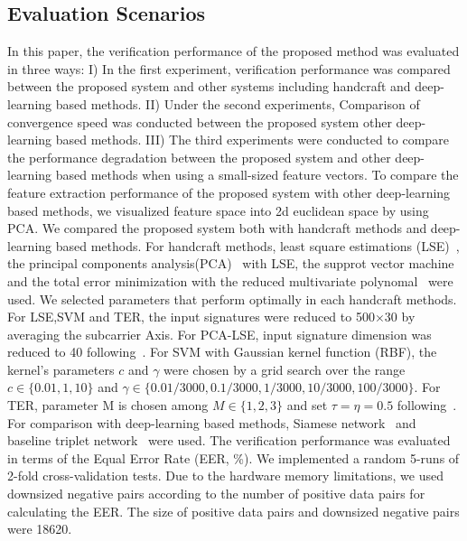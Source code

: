 \subsection{Evaluation Scenarios}
In this paper, the verification performance of the proposed method was evaluated in three ways:
I) In the first experiment, verification performance was compared between the proposed system and other systems including handcraft and deep-learning based methods.
II) Under the second experiments, Comparison of convergence speed was conducted between the proposed system other deep-learning based methods. 
III) The third experiments were conducted to compare the performance degradation between the proposed system and other deep-learning based methods when using a small-sized feature vectors. 
To compare the feature extraction performance of the proposed system with other deep-learning based methods, we visualized feature space into 2d euclidean space by using PCA. 
We compared the proposed system both with handcraft methods and deep-learning based methods.
For handcraft methods, least square estimations (LSE)~\cite{duda2012pattern}, the principal components analysis(PCA)~\cite{turk1991eigenfaces} with LSE, the supprot vector machine~\cite{vapnik2013nature} and the total error minimization with the reduced multivariate polynomal~\cite{toh2003fingerprint,toh2008between} were used. We selected parameters that perform optimally in each handcraft methods. For LSE,SVM and TER, the input signatures were reduced to 500$\times$30 by averaging the subcarrier Axis. For PCA-LSE, input signature dimension was reduced to 40 following~\cite{moon2017air}. For SVM with Gaussian kernel function (RBF), the kernel's parameters $c$ and $\gamma$ were chosen by a grid search over the range $c\in\{0.01,1,10\}$ and $\gamma\in\{0.01/3000, 0.1/3000, 1/3000, 10/3000, 100/3000\}$. For TER, parameter M is chosen among $M\in\{1,2,3\}$ and set $\tau=\eta=0.5$ following~\cite{toh2008between}.
For comparison with deep-learning based methods, Siamese network~\cite{koch2015siamese} and baseline triplet network~\cite{hoffer2015deep} were used.
The verification performance was evaluated in terms of the Equal Error Rate (EER, \%). We implemented a random 5-runs of 2-fold cross-validation tests.
Due to the hardware memory limitations, we used downsized negative pairs according to the number of positive data pairs for calculating the EER. The size of positive data pairs and downsized negative pairs were 18620.

